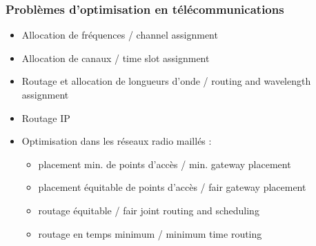 \documentclass{beamer}
\begin{document}
\begin{frame}
  \frametitle{Problèmes d'optimisation en télécommunications}

  \begin{itemize}
  \item Allocation de fréquences / channel assignment
  \item Allocation de canaux / time slot assignment
  \item Routage et allocation de longueurs d'onde / routing and wavelength assignment
  \item Routage IP
  \item Optimisation dans les réseaux radio maillés :
    \begin{itemize}
    \item placement min. de points d'accès / min. gateway placement
    \item placement équitable de points d'accès / fair gateway placement
    \item routage équitable / fair joint routing and scheduling
    \item routage en temps minimum / minimum time routing
    \end{itemize}
  \end{itemize}
  
\end{frame}
\end{document}
